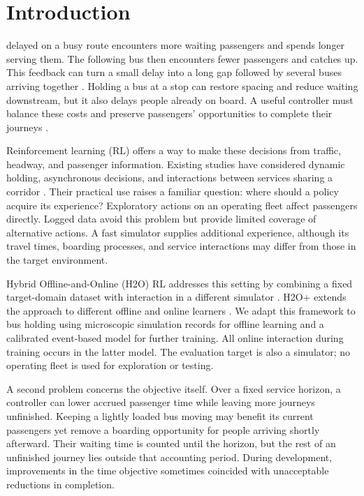 \documentclass[letterpaper,journal]{IEEEtran}
\begin{document}
\section{Introduction}
\label{sec:introduction}
 delayed on a busy route encounters more waiting passengers and spends longer serving them. The following bus then encounters fewer passengers and catches up. This feedback can turn a small delay into a long gap followed by several buses arriving together \cite{rezazada2024review,daganzo2009headway}. Holding a bus at a stop can restore spacing and reduce waiting downstream, but it also delays people already on board. A useful controller must balance these costs and preserve passengers' opportunities to complete their journeys \cite{delgado2012holding}.

Reinforcement learning (RL) offers a way to make these decisions from traffic, headway, and passenger information. Existing studies have considered dynamic holding, asynchronous decisions, and interactions between services sharing a corridor \cite{alesiani2018reinforcement,wang2020real,wang2021asynchronous,wang2023multiobjective}. Their practical use raises a familiar question: where should a policy acquire its experience? Exploratory actions on an operating fleet affect passengers directly. Logged data avoid this problem but provide limited coverage of alternative actions. A fast simulator supplies additional experience, although its travel times, boarding processes, and service interactions may differ from those in the target environment.

Hybrid Offline-and-Online (H2O) RL addresses this setting by combining a fixed target-domain dataset with interaction in a different simulator \cite{niu2022h2o}. H2O+ extends the approach to different offline and online learners \cite{niu2025h2oplus}. We adapt this framework to bus holding using microscopic simulation records for offline learning and a calibrated event-based model for further training. All online interaction during training occurs in the latter model. The evaluation target is also a simulator; no operating fleet is used for exploration or testing.

A second problem concerns the objective itself. Over a fixed service horizon, a controller can lower accrued passenger time while leaving more journeys unfinished. Keeping a lightly loaded bus moving may benefit its current passengers yet remove a boarding opportunity for people arriving shortly afterward. Their waiting time is counted until the horizon, but the rest of an unfinished journey lies outside that accounting period. During development, improvements in the time objective sometimes coincided with unacceptable reductions in completion.
\end{document}
